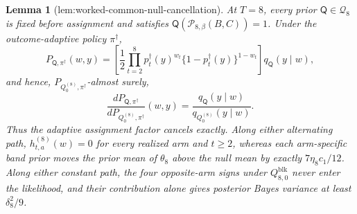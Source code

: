 \documentclass{article}
\newtheorem{lemma}{Lemma}
\begin{document}
\begin{lemma}[lem:worked-common-null-cancellation]\label{lem:worked-common-null-cancellation}
At \(T=8\), every prior \(\mathsf Q\in\mathcal Q_8\) is fixed before assignment and satisfies \(\mathsf Q(\mathcal P_{8,\beta}(B,C))=1\). Under the outcome-adaptive policy \(\pi^\dagger\), \[P_{\mathsf Q,\pi^\dagger}(w,y)=\left[\frac12\prod_{t=2}^8p_t^\dagger(y)^{w_t}\{1-p_t^\dagger(y)\}^{1-w_t}\right]q_{\mathsf Q}(y\mid w),\] and hence, \(P_{Q_0^{(8)},\pi^\dagger}\)-almost surely, \[\frac{dP_{\mathsf Q,\pi^\dagger}}{dP_{Q_0^{(8)},\pi^\dagger}}(w,y)=\frac{q_{\mathsf Q}(y\mid w)}{q_{Q_0^{(8)}}(y\mid w)}.\] Thus the adaptive assignment factor cancels exactly. Along either alternating path, \(h_{t,a}^{(8)}(w)=0\) for every realized arm and \(t\ge2\), whereas each arm-specific band prior moves the prior mean of \(\theta_8\) above the null mean by exactly \(7\eta_8c_1/12\). Along either constant path, the four opposite-arm signs under \(Q_{8,0}^{\mathrm{blk}}\) never enter the likelihood, and their contribution alone gives posterior Bayes variance at least \(\delta_8^2/9\).
\end{lemma}
\end{document}
